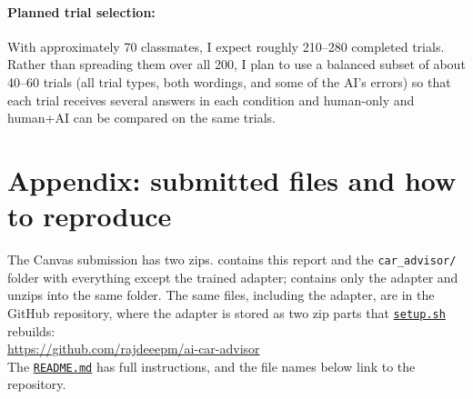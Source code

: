 \documentclass[11pt]{article}
\newcommand{\code}[1]{\texttt{\small #1}}
\newcommand{\repourl}{https://github.com/rajdeeepm/ai-car-advisor}
\newcommand{\gh}[2]{\href{\repourl/blob/main/#1}{\code{#2}}}
\begin{document}
\paragraph{Planned trial selection:} With approximately 70 classmates, I expect roughly 210--280 completed
trials. Rather than spreading them over all 200, I plan to use a balanced subset of about 40--60
trials (all trial types, both wordings, and some of the AI's errors) so that each trial receives
several answers in each condition and human-only and human+AI can be compared on the same trials.



\section*{Appendix: submitted files and how to reproduce}

The Canvas submission has two zips.  contains this
report and the \code{car\_advisor/} folder with everything except the trained adapter;
 contains only the adapter and unzips into the same
folder. The same files, including the adapter, are in the GitHub repository, where the adapter is
stored as two zip parts that \gh{setup.sh}{setup.sh} rebuilds:\\ \url{https://github.com/rajdeeepm/ai-car-advisor}\\
The \gh{README.md}{README.md} has full instructions, and the file names below link to the repository.
\end{document}

